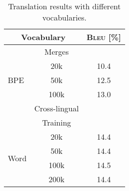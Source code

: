 \documentclass[11pt, a4paper, landscape]{article}
\begin{document}
	
	\NewPage
	\vfill
	\begin{table}[!ht]
		\centering
		\begin{tabular}{lcc}
			\toprule
			\multicolumn{2}{c}{Vocabulary} & \textsc{Bleu} [\%] \\
			\midrule
			& Merges \\
			\cmidrule{2-2}
			\multirow{3}{*}{BPE} & 20k & 10.4 \\
			& 50k & 12.5 \\
			& 100k & 13.0 \\
			\midrule
			& Cross-lingual \\
			& Training \\
			\cmidrule{2-2}
			\multirow{4}{*}{Word} & 20k & 14.4\\
			& 50k & 14.4\\
			& 100k & 14.5\\
			& 200k & 14.4\\
			\bottomrule
		\end{tabular}
		\caption{Translation results with different vocabularies.}
		\label{tab:vocab}
	\end{table}
	\vfill
	\FinalPage
	

	
	
	\NewPage
	
	
	
\end{document}

